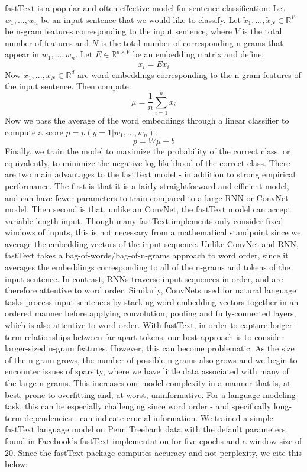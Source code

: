 \documentclass[a4paper]{article}
\begin{document}
fastText is a popular and often-effective model for sentence classification. Let $w_1,...,w_n$ be an input sentence that we would like to classify. Let $\tilde{x}_1,...,\tilde{x}_N \in \mathbb{R}^V$ be n-gram features corresponding to the input sentence, where $V$ is the total number of features and $N$ is the total number of corresponding n-grams that appear in $w_1,...,w_n$. Let $E \in \mathbb{R}^{d \times V}$ be an embedding matrix and define:
$$x_i = E \tilde{x}_i $$
Now $x_1,...,x_N \in \mathbb{R}^{d}$ are word embeddings corresponding to the n-gram features of the input sentence. Then compute:
$$\mu = \frac{1}{n} \sum_{i=1}^n x_i $$
Now we pass the average of the word embeddings through a linear classifier to compute a score $p = p(y=1 | w_1,...,w_n)$:
$$ p = W \mu + b $$
Finally, we train the model to maximize the probability of the correct class, or equivalently, to minimize the negative log-likelihood of the correct class. 
\newline
\newline
There are two main advantages to the fastText model - in addition to strong empirical performance. The first is that it is a fairly straightforward and efficient model, and can have fewer parameters to train compared to a large RNN or ConvNet model. Then second is that, unlike an ConvNet, the fastText model can accept variable-length input. Though many fastText implements only consider fixed windows of inputs, this is not necessary from a mathematical standpoint since we average the embedding vectors of the input sequence.
\newline
\newline
Unlike ConvNet and RNN, fastText takes a bag-of-words/bag-of-n-grams approach to word order, since it averages the embeddings corresponding to all of the n-grams and tokens of the input sentence. In contrast, RNNs traverse input sequences in order, and are therefore attentive to word order. Similarly, ConvNets used for natural language tasks process input sentences by stacking word embedding vectors together in an ordered manner before applying convolution, pooling and fully-connected layers, which is also attentive to word order. With fastText, in order to capture longer-term relationships between far-apart tokens, our best approach is to consider larger-sized n-gram features. However, this can become problematic. As the size of the n-gram grows, the number of possible n-grams also grows and we begin to encounter issues of sparsity, where we have little data associated with many of the large n-grams. This increases our model complexity in a manner that is, at best, prone to overfitting and, at worst, uninformative. For a language modeling task, this can be especially challenging since word order - and specifically long-term dependencies - can indicate crucial information. 
\newline
\newline
We trained a simple fastText language model on Penn Treebank data with the default parameters found in Facebook's fastText implementation for five epochs and a window size of 20. Since the fastText package computes accuracy and not perplexity, we cite this below:
\end{document}
